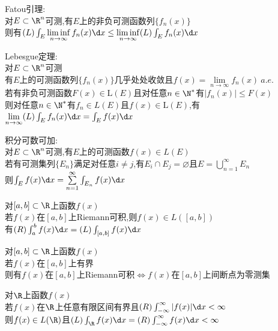 \begin{dingli}
Fatou引理:\\
对$E\subset\R^n$可测,有$E$上的非负可测函数列$\{f_n(x)\}$\\
则有$(L)\int_{E}\liminf\limits_{n\to\infty}f_n(x)\d x\leq\liminf\limits_{n\to\infty}(L)\int_{E}f_n(x)\d x$
\end{dingli}

\begin{dingli}
Lebesgue定理:\\
对$E\subset\R^n$可测\\
有$E$上的可测函数列$\{f_n(x)\}$几乎处处收敛且$f(x)=\lim\limits_{n\to\infty}f_n(x)\ a.e.$\\
若有非负可测函数$F(x)\in \mathrm{L}(E)$且对任意$n\in \N^*$有$|f_n(x)|\leq F(x)$\\
则对任意$n\in \N^*$有$f_n\in L(E)$且$f(x)\in \mathrm{L}(E)$,有$\lim\limits_{n\to\infty}(L)\int_{E}f_n(x)\d x=\int_{E}f(x)\d x$
\end{dingli}

\begin{dingli}
积分可数可加:\\
对$E\subset\R^n$可测,有$E$上的可测函数$f(x)\in L(E)$\\
若有可测集列$\{E_n\}$满足对任意$i\neq j$,有$E_i\cap E_j=\varnothing$且$E=\bigcup\limits_{n=1}^{\infty}E_n$\\
则$\int_{E}f(x)\d x=\sum\limits_{n=1}^{\infty}\int_{E_n}f(x)\d x$
\end{dingli}

\begin{dingli}
对$[a,b]\subset\R$上函数$f(x)$\\
若$f(x)$在$[a,b]$上Riemann可积,则$f(x)\in L([a,b])$\\
有$(R)\int_{a}^{b}f(x)\d x=(L)\int_{[a,b]}f(x)\d x$
\end{dingli}

\begin{dingli}
对$[a,b]\subset\R$上函数$f(x)$\\
若$f(x)$在$[a,b]$上有界\\
则有$f(x)$在$[a,b]$上Riemann可积$\Leftrightarrow$$f(x)$在$[a,b]$上间断点为零测集
\end{dingli}

\begin{dingli}
对$\R$上函数$f(x)$\\
若$f(x)$在$\R$上任意有限区间有界且$(R)\int_{-\infty}^{\infty}|f(x)|\d x<\infty$\\
则$f(x)\in L(\R)$且$(L)\int_{\R}f(x)\d x=(R)\int_{-\infty}^{\infty}f(x)\d x<\infty$
\end{dingli}

